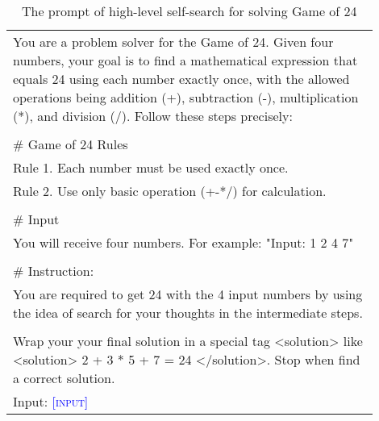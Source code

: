 \begin{table*}[ht]
\small
\centering
\caption{The prompt of high-level self-search for solving Game of 24}
\begin{tabular}{p{0.9\linewidth}} \toprule

You are a problem solver for the Game of 24. Given four numbers, your goal is to find a mathematical expression that equals 24 using each number exactly once, with the allowed operations being addition (+), subtraction (-), multiplication (*), and division (/). Follow these steps precisely:\\
\\
\# Game of 24 Rules\\
Rule 1. Each number must be used exactly once.\\
Rule 2. Use only basic operation (+-*/) for calculation.\\
\\
\# Input\\
You will receive four numbers. For example: "Input: 1 2 4 7"\\
\\
\# Instruction:\\
You are required to get 24 with the 4 input numbers by using the idea of search for your thoughts in the intermediate steps.\\
\\
Wrap your your final solution in a special tag <solution> like <solution> 2 + 3 * 5 + 7 = 24 </solution>. Stop when find a correct solution.\\
Input: \textcolor{blue}{\textsc{[input]}}
\\ \bottomrule
\end{tabular}
\label{tab:high_level_self_search_prompt}
\end{table*}

